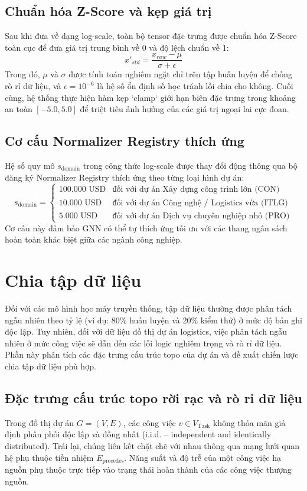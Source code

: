 \subsection{Chuẩn hóa Z-Score và kẹp giá trị}
Sau khi đưa về dạng log-scale, toàn bộ tensor đặc trưng được chuẩn hóa Z-Score toàn cục để đưa giá trị trung bình về 0 và độ lệch chuẩn về 1:
$$x'_{std} = \frac{x_{raw} - \mu}{\sigma + \epsilon}$$
Trong đó, $\mu$ và $\sigma$ được tính toán nghiêm ngặt chỉ trên tập huấn luyện để chống rò rỉ dữ liệu, và $\epsilon = 10^{-6}$ là hệ số ổn định số học tránh lỗi chia cho không. Cuối cùng, hệ thống thực hiện hàm kẹp `clamp` giới hạn biên đặc trưng trong khoảng an toàn $[-5.0, 5.0]$ để triệt tiêu ảnh hưởng của các giá trị ngoại lai cực đoan.

\subsection{Cơ cấu Normalizer Registry thích ứng}
Hệ số quy mô $s_{\text{domain}}$ trong công thức log-scale được thay đổi động thông qua bộ đăng ký Normalizer Registry thích ứng theo từng loại hình dự án:
$$s_{\text{domain}} = \begin{cases} 100.000 \text{ USD} & \text{đối với dự án Xây dựng công trình lớn (CON)} \\ 10.000 \text{ USD} & \text{đối với dự án Công nghệ / Logistics vừa (ITLG)} \\ 5.000 \text{ USD} & \text{đối với dự án Dịch vụ chuyên nghiệp nhỏ (PRO)} \end{cases}$$
Cơ cấu này đảm bảo GNN có thể tự thích ứng tối ưu với các thang ngân sách hoàn toàn khác biệt giữa các ngành công nghiệp.

\section{Chia tập dữ liệu}
\label{sec:2.8_dataset_splitting}

Đối với các mô hình học máy truyền thống, tập dữ liệu thường được phân tách ngẫu nhiên theo tỷ lệ (ví dụ: 80\% huấn luyện và 20\% kiểm thử) ở mức độ bản ghi độc lập. Tuy nhiên, đối với dữ liệu đồ thị dự án logistics, việc phân tách ngẫu nhiên ở mức công việc sẽ dẫn đến các lỗi logic nghiêm trọng và rò rỉ dữ liệu. Phần này phân tích các đặc trưng cấu trúc topo của dự án và đề xuất chiến lược chia tập dữ liệu phù hợp.

\subsection{Đặc trưng cấu trúc topo rời rạc và rò rỉ dữ liệu}
Trong đồ thị dự án $G = (V, E)$, các công việc $v \in V_{\text{Task}}$ không thỏa mãn giả định phân phối độc lập và đồng nhất (i.i.d. -- independent and identically distributed). Trái lại, chúng liên kết chặt chẽ với nhau thông qua mạng lưới quan hệ phụ thuộc tiền nhiệm $E_{\text{precedes}}$. Năng suất và độ trễ của một công việc hạ nguồn phụ thuộc trực tiếp vào trạng thái hoàn thành của các công việc thượng nguồn. 

